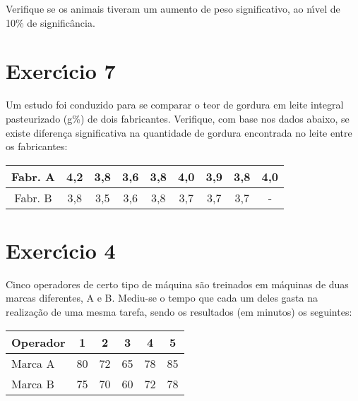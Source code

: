 \documentclass[a4paper,11pt,twoside,openright]{report}
\begin{document}
Verifique se os animais tiveram um aumento de peso significativo, ao n\'{\i}vel de 10\% de signific\^{a}ncia.

\section*{Exerc\'{\i}cio 7}
\hspace{0.5cm}Um estudo foi conduzido para se comparar o teor de gordura em leite integral pasteurizado (g\%) de dois fabricantes. 
Verifique, com base nos dados abaixo, se existe diferen\c{c}a significativa na quantidade de gordura encontrada no leite entre os fabricantes:

\begin{center}
\begin{tabular}{|l|l|l|l|l|l|l|l|l|}
\hline
\multicolumn{1}{|c|}{Fabr. A} & \multicolumn{1}{c|}{4,2} & \multicolumn{1}{c|}{3,8} & \multicolumn{1}{c|}{3,6} & \multicolumn{1}{c|}{3,8} & \multicolumn{1}{c|}{4,0} & \multicolumn{1}{c|}{3,9} & \multicolumn{1}{c|}{3,8} & \multicolumn{1}{c|}{4,0} \\ 
\hline
\multicolumn{1}{|c|}{Fabr. B} & \multicolumn{1}{c|}{3,8} & \multicolumn{1}{c|}{3,5} & \multicolumn{1}{c|}{3,6} & \multicolumn{1}{c|}{3,8} & \multicolumn{1}{c|}{3,7} & \multicolumn{1}{c|}{3,7} & \multicolumn{1}{c|}{3,7} & \multicolumn{1}{c|}{-} \\ 
\hline
\end{tabular}
\end{center}

\section*{Exerc\'{\i}cio 4}
\hspace{0.5cm} Cinco operadores de certo tipo de m\'{a}quina s\~{a}o treinados em m\'{a}quinas de duas marcas diferentes, A e B. 
Mediu-se o tempo que cada um deles gasta na realiza\c{c}\~{a}o de uma mesma tarefa, sendo os resultados (em minutos) os seguintes:

\begin{center}
\begin{tabular}{|l|l|l|l|l|l|}
\hline
Operador & \multicolumn{1}{c|}{1} & \multicolumn{1}{c|}{2} & \multicolumn{1}{c|}{3} & \multicolumn{1}{c|}{4} & \multicolumn{1}{c|}{5} \\ 
\hline
Marca A & \multicolumn{1}{c|}{80} & \multicolumn{1}{c|}{72} & \multicolumn{1}{c|}{65} & \multicolumn{1}{c|}{78} & \multicolumn{1}{c|}{85} \\ 
\hline
Marca B & \multicolumn{1}{c|}{75} & \multicolumn{1}{c|}{70} & \multicolumn{1}{c|}{60} & \multicolumn{1}{c|}{72} & \multicolumn{1}{c|}{78} \\ 
\hline
\end{tabular}
\end{center}
\end{document}
